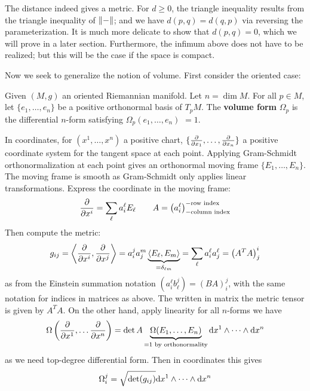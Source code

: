 \documentclass{article}
\begin{document}
\begin{remark}
    The distance indeed gives a metric. For $d \geq 0$, the triangle inequality results from the triangle inequality of $\left\|-\right\|$; and we have $d(p, q) = d(q, p)$ via reversing the parameterization. It is much more delicate to show that $d(p, q) = 0$, which we will prove in a later section. Furthermore, the infimum above does not have to be realized; but this will be the case if the space is compact.
\end{remark}

Now we seek to generalize the notion of volume. First consider the oriented case:
\begin{definition}
    Given $(M, g)$ an oriented Riemannian manifold. Let $n = \dim M$. For all $p \in M$, let $\{ e_1, \dots, e_n \}$ be a positive orthonormal basis of $T_p M$. The \textbf{volume form} $\Omega_p$ is the differential $n$-form satisfying $\Omega_p(e_1, \dots, e_n)$ $= 1$. 
\end{definition}

In coordinates, for $(x^1, \dots, x^n)$ a positive chart, $\{ \frac{\partial}{\partial x_1}, \dots, \frac{\partial}{\partial x_n} \}$ a positive coordinate system for the tangent space at each point. Applying Gram-Schmidt orthonormalization at each point gives an orthonormal moving frame $\{ E_1, \dots, E_n \}$. The moving frame is smooth as Gram-Schmidt only applies linear transformations. Express the coordinate in the moving frame:
\[
    \frac{\partial}{\partial x^i} = \sum_{\ell} a_i^{\ell} E_{\ell} \qquad A = \left( a_i^{\ell} \right) _{-\text{column index}}^{-\text{row index}}
\]
Then compute the metric:
\[
    g_{ij} = \left\langle \frac{\partial}{\partial x^i}, \frac{\partial}{\partial x^j} \right\rangle = a_i^j a_j^m \underbrace{\left\langle E_{\ell}, E_m \right\rangle}_{=\delta_{\ell m}} = \sum_{\ell} a_i^{\ell} a_j^{\ell} = \left( A^T A \right)_j^i
\]
as from the Einstein summation notation $\left( a_i^{\ell} b_{\ell}^j \right) = (BA)_i^j$, with the same notation for indices in matrices as above. The written in matrix the metric tensor is given by $A^T A$. On the other hand, apply linearity for all $n$-forms we have
\[
    \Omega \left( \frac{\partial}{\partial x^1}, \dots \frac{\partial}{\partial x^n} \right) = \det A \underbrace{\Omega(E_1, \dots, E_n)}_{=1 \text{ by orthonormality}} \mathrm{d} x^1 \wedge \cdots \wedge \mathrm{d} x^n
\]
as we need top-degree differential form. Then in coordinates this gives
\[
    \Omega_i^j = \sqrt{\det (g_{ij})} \mathrm{d} x^1 \wedge \cdots \wedge \mathrm{d} x^n
\]
\end{document}
